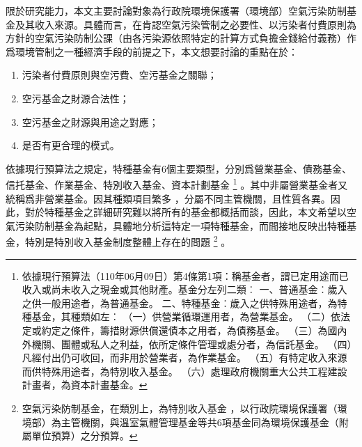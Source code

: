 \documentclass[12pt,a4paper]{article}
\begin{document}

限於研究能力，本文主要討論對象為行政院環境保護署（環境部）空氣污染防制基金及其收入來源。具體而言，在肯認空氣污染管制之必要性、以污染者付費原則為方針的空氣污染防制公課（由各污染源依照特定的計算方式負擔金錢給付義務）作爲環境管制之一種經濟手段的前提之下，本文想要討論的重點在於：
\begin{enumerate}[topsep=0.5em, partopsep=0pt, itemsep=0pt, parsep=0pt,leftmargin=3em]
  \item 污染者付費原則與空污費、空污基金之關聯；
  \item 空污基金之財源合法性；
  \item 空污基金之財源與用途之對應；
  \item 是否有更合理的模式。
  \end{enumerate}  


依據現行預算法之規定，特種基金有6個主要類型，分別爲營業基金、債務基金、信托基金、作業基金、特別收入基金、資本計劃基金
\footnote{依據現行預算法（110年06月09日）第4條第1項：稱基金者，謂已定用途而已收入或尚未收入之現金或其他財產。基金分左列二類︰
一、普通基金︰歲入之供一般用途者，為普通基金。
二、特種基金︰歲入之供特殊用途者，為特種基金，其種類如左︰
（一）供營業循環運用者，為營業基金。
（二）依法定或約定之條件，籌措財源供償還債本之用者，為債務基金。
（三）為國內外機關、團體或私人之利益，依所定條件管理或處分者，為信託基金。
（四）凡經付出仍可收回，而非用於營業者，為作業基金。
（五）有特定收入來源而供特殊用途者，為特別收入基金。
（六）處理政府機關重大公共工程建設計畫者，為資本計畫基金。}
。其中非屬營業基金者又統稱爲非營業基金。因其種類項目繁多
，分屬不同主管機關，且性質各異。因此，對於特種基金之詳細研究難以將所有的基金都概括而談，因此，本文希望以空氣污染防制基金為起點，具體地分析這特定一項特種基金，而間接地反映出特種基金，特別是特別收入基金制度整體上存在的問題
\footnote{空氣污染防制基金，在類別上，為特別收入基金
，以行政院環境保護署（環境部）為主管機關，與溫室氣體管理基金等共6項基金同為環境保護基金（附屬單位預算）之分預算。}
。



\end{document}
